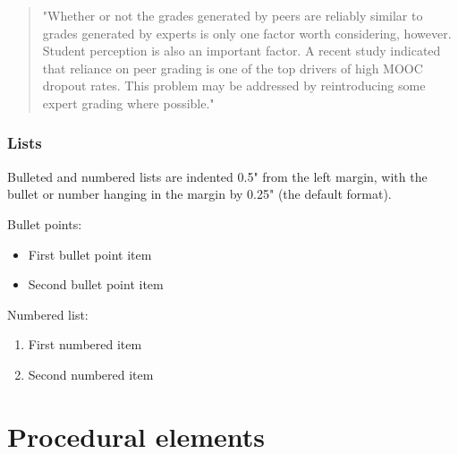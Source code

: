 \documentclass[
	letterpaper, %
]{jdf}
\begin{document}
\begin{quotation}
"Whether or not the grades generated by peers are reliably similar to grades generated by experts is only one factor worth considering, however. Student perception is also an important factor. A recent study indicated that reliance on peer grading is one of the top drivers of high MOOC dropout rates. This problem may be addressed by reintroducing some expert grading where possible." \citep{joyner2016}
\end{quotation}

\subsubsection{Lists}
Bulleted and numbered lists are indented 0.5" from the left margin, with the bullet or number hanging in the margin by 0.25" (the default format).

Bullet points:

\begin{itemize}
	\item First bullet point item
	\item Second bullet point item
\end{itemize}

Numbered list:

\begin{enumerate}
	\item First numbered item
	\item Second numbered item
\end{enumerate}

\section{Procedural elements}
\end{document}
